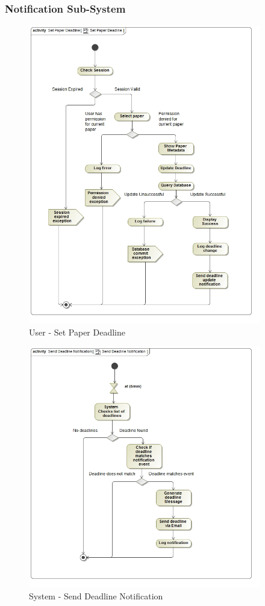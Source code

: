 \documentclass{article}
\begin{document}
			\subsubsection{Notification Sub-System}
			\begin{figure}[H]
				\includegraphics[width=4in, center]{../Diagrams/Process Specifications/Notification subsystem/Set Paper Deadline.jpg}
				\caption{User - Set Paper Deadline}
			\end{figure}
			\begin{figure}[H]
				\includegraphics[width=4in, center]{../Diagrams/Process Specifications//Notification subsystem/Send Deadline Notification.jpg}
				\caption{System - Send Deadline Notification}
			\end{figure}
\end{document}
